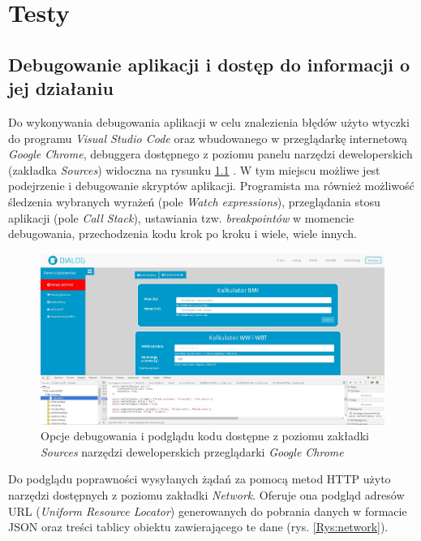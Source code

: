 \chapter{Testy}

\section{Debugowanie aplikacji i dostęp do informacji o jej działaniu}
Do wykonywania debugowania aplikacji w celu znalezienia błędów użyto wtyczki do programu \textit{Visual Studio Code} oraz wbudowanego w przeglądarkę internetową \textit{Google Chrome}, debuggera dostępnego z poziomu panelu narzędzi deweloperskich (zakładka \textit{Sources}) widoczna na rysunku \ref{Rys:sources} . W tym miejscu możliwe jest podejrzenie i debugowanie skryptów aplikacji. Programista ma również możliwość śledzenia wybranych wyrażeń (pole \textit{Watch expressions}), przeglądania stosu aplikacji (pole \textit{Call Stack}), ustawiania tzw. \textit{breakpointów} w momencie debugowania, przechodzenia kodu krok po kroku i wiele, wiele innych.

\begin{figure}[h]
	\centering\includegraphics[scale=0.3]{images/sources.jpg}
	\caption{Opcje debugowania i podglądu kodu dostępne z poziomu zakładki \textit{Sources} narzędzi deweloperskich przeglądarki \textit{Google Chrome}}
	\label{Rys:sources}
\end{figure}


Do podglądu poprawności wysyłanych żądań za pomocą metod HTTP użyto narzędzi dostępnych z poziomu zakładki \textit{Network}. Oferuje ona podgląd adresów URL (\textit{Uniform Resource Locator}) generowanych do pobrania danych w formacie JSON oraz treści tablicy obiektu zawierającego te dane (rys. \ref{Rys:network}).
 
